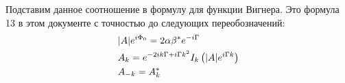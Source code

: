\documentclass[a4paper, 12pt]{article}
\newenvironment{eqw}{\begin{equation} \begin{aligned}}   
    {\end{aligned}    \end{equation}}
\begin{document}
Подставим данное соотношение в формулу для функции Вигнера. Это формула 13 в этом документе с точностью до следующих переобозначений:
\begin{eqw}
     &\abs{A}e^{i\Phi_0} = 2\alpha\beta^*e^{-i\Gamma}\\
     &A_k = e^{-2ik\Gamma+i\Gamma k^2}I_{k}\left(\abs{A}e^{i\Gamma k}\right)\\
     &A_{-k} = A_k^*
\end{eqw}
\end{document}
